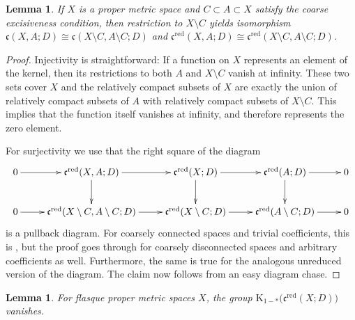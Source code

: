 \documentclass[pdftex]{sigma}
\numberwithin{equation}{section}
\newtheorem{lem}[thm]{Lemma}
\theoremstyle{definition}
\newcommand{\K}{\mathrm{K}}
\newcommand{\sHigCor}{\mathfrak{c}}
\newcommand{\sHigCorRed}{\mathfrak{c}^{\mathrm{red}}}
\begin{document}
\begin{lem}\label{lem:sHigCorExcision}
If $X$ is a proper metric space and $C\subset A\subset X$ satisfy the coarse excisiveness condition, then restriction to $X\setminus C$ yields isomorphism
\(\sHigCor(X,A;D)\cong\sHigCor(X\setminus C,A\setminus C;D)\) and \(\sHigCorRed(X,A;D)\cong\sHigCorRed(X\setminus C,A\setminus C;D)\).
\end{lem}


\begin{proof}
Injectivity is straightforward: If a function on $X$ represents an element of the kernel, then its restrictions to both $A$ and $X\setminus C$ vanish at infinity. These two sets cover $X$ and the relatively compact subsets of $X$ are exactly the union of relatively compact subsets of $A$ with relatively compact subsets of $X\setminus C$. This implies that the function itself vanishes at infinity, and therefore represents the zero element.

For surjectivity we use that the right square of the diagram
\[
\xymatrix{
0\ar[r]&\sHigCorRed(X,A;D)\ar[r]\ar[d]&\sHigCorRed(X;D)\ar[r]\ar[d]&\sHigCorRed(A;D)\ar[r]\ar[d]&0
\\0\ar[r]&\sHigCorRed(X\setminus C,A\setminus C;D)\ar[r]&\sHigCorRed(X\setminus C;D)\ar[r]&\sHigCorRed(A\setminus C;D)\ar[r]&0
}
\]
is a pullback diagram. For coarsely connected spaces and trivial coefficients, this is \cite[Lem\-ma~3.3]{WillettHomological}, but the proof goes through for coarsely disconnected spaces and arbitrary coefficients as well. Furthermore, the same is true for the analogous unreduced version of the diagram.
The claim now follows from an easy diagram chase.
\end{proof}

\begin{lem}\label{lem:sHigCorRedFlasque}
For flasque proper metric spaces $X$, the group $\K_{1-*}\big(\sHigCorRed(X;D)\big)$ vanishes.
\end{lem}
\end{document}
